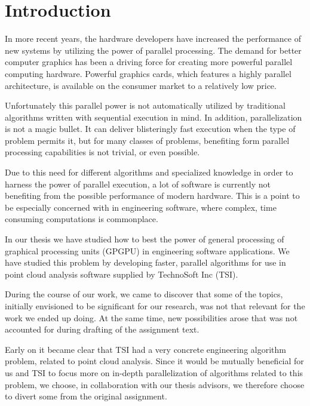 \chapter{Introduction}

In more recent years, the hardware developers have increased the performance of new systems by utilizing the power of parallel processing. The demand for better computer graphics has been a driving force for creating more powerful parallel computing hardware. Powerful graphics cards, which features a highly parallel architecture, is available on the consumer market to a relatively low price.

Unfortunately this parallel power is not automatically utilized by traditional algorithms written with sequential execution in mind. In addition, parallelization is not a magic bullet. It can deliver blisteringly fast execution when the type of problem permits it, but for many classes of problems, benefiting form parallel processing capabilities is not trivial, or even possible.

Due to this need for different algorithms and specialized knowledge in order to harness the power of parallel execution, a lot of software is currently not benefiting from the possible performance of modern hardware. This is a point to be especially concerned with in engineering software, where complex, time consuming computations is commonplace.

In our thesis we have studied how to best the power of general processing of graphical processing units (GPGPU) in engineering software applications. We have studied this problem by developing faster, parallel algorithms for use in point cloud analysis software supplied by TechnoSoft Inc (TSI).

During the course of our work, we came to discover that some of the topics, initially envisioned to be significant for our research, was not that relevant for the work we ended up doing. At the same time, new possibilities arose that was not accounted for during drafting of the assignment text. 

Early on it became clear that TSI had a very concrete engineering algorithm problem, related to point cloud analysis. Since it would be mutually beneficial for us and TSI to focus more on in-depth parallelization of algorithms related to this problem, we choose, in collaboration with our thesis advisors, we therefore choose to divert some from the original assignment.

